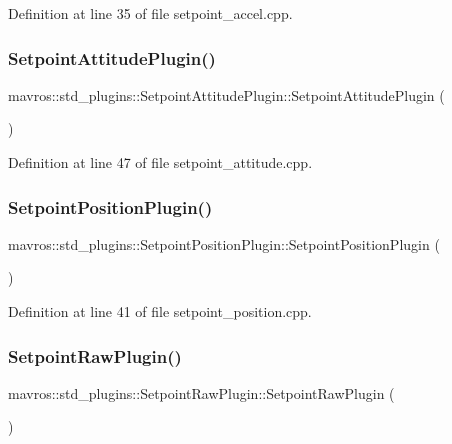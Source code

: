 Definition at line 35 of file setpoint\+\_\+accel.\+cpp.

\mbox{\label{group__plugin_ga59562b4cfc4d05afd3772b3e4d050098}} 
\subsubsection{\texorpdfstring{SetpointAttitudePlugin()}{SetpointAttitudePlugin()}}
{\footnotesize\ttfamily mavros\+::std\+\_\+plugins\+::\+Setpoint\+Attitude\+Plugin\+::\+Setpoint\+Attitude\+Plugin (\begin{DoxyParamCaption}{ }\end{DoxyParamCaption})\hspace{0.3cm}{\ttfamily [inline]}}



Definition at line 47 of file setpoint\+\_\+attitude.\+cpp.

\mbox{\label{group__plugin_ga79d0cd0249bfbbcb1d98e6e938a95f5a}} 
\subsubsection{\texorpdfstring{SetpointPositionPlugin()}{SetpointPositionPlugin()}}
{\footnotesize\ttfamily mavros\+::std\+\_\+plugins\+::\+Setpoint\+Position\+Plugin\+::\+Setpoint\+Position\+Plugin (\begin{DoxyParamCaption}{ }\end{DoxyParamCaption})\hspace{0.3cm}{\ttfamily [inline]}}



Definition at line 41 of file setpoint\+\_\+position.\+cpp.

\mbox{\label{group__plugin_ga6963f8398466a36a1ecd8669d8bd315c}} 
\subsubsection{\texorpdfstring{SetpointRawPlugin()}{SetpointRawPlugin()}}
{\footnotesize\ttfamily mavros\+::std\+\_\+plugins\+::\+Setpoint\+Raw\+Plugin\+::\+Setpoint\+Raw\+Plugin (\begin{DoxyParamCaption}{ }\end{DoxyParamCaption})\hspace{0.3cm}{\ttfamily [inline]}}



